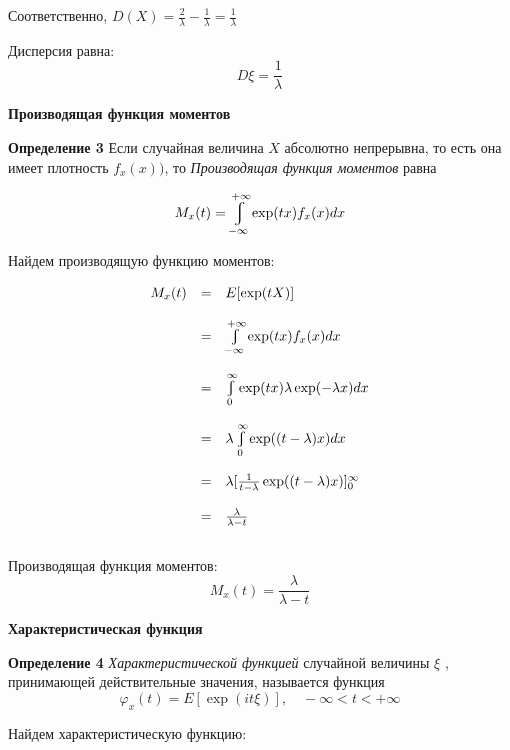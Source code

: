 \documentclass[a4paper,12pt, oneside]{book}
\let\int\varint
\begin{document}
	
	Соответственно, $D(X) = \frac{2}{\lambda} - \frac{1}{\lambda} = \frac{1}{\lambda}$ 
	\vspace{\baselineskip}
	
	Дисперсия равна:
	$$
	D\xi =  \frac{1}{\lambda}
	$$
	
	
	\vspace{5mm}
	\large{\textbf{Производящая функция моментов}}
	\vspace{5mm}
	
	\normalsize{\textbf{Определение 3}} Если случайная величина $X$ абсолютно непрерывна, то есть она имеет плотность $f_x(x))$, то \textit{ Производящая функция моментов } равна
		
	$$
	M_x(t) =  \int_{-\infty}^{+\infty} \exp(tx) f_x(x)dx
	$$
	
	\vspace{\baselineskip}
	Найдем производящую функцию моментов:
	
	$$
	\begin{array}{rcl}
	M_x(t) &=& E[\exp(tX)] \\
	\\
	&=& \int\limits_{-\infty}^{+\infty} \exp(tx) f_x(x)dx \\
	\\
	&=& \int\limits_0^\infty \exp(tx) \lambda \exp(-\lambda x)dx\\
	\\
	&=& \lambda \int\limits_0^\infty \exp((t-\lambda) x)dx\\
	\\
	&=&\lambda[\frac{1}{t-\lambda} \exp((t-\lambda) x)]_0^\infty\\
	\\
	&=&\frac{\lambda}{\lambda-t}
	\end{array}
	$$
	\\
	Производящая функция моментов:
	$$
	M_x(t) = \frac{\lambda}{\lambda-t}
	$$
	 
	 
	\newpage
	\large{\textbf{{Характеристическая функция}}}
	\vspace{5mm}
	
	\normalsize{\textbf{Определение 4}}\textit{ Характеристической функцией } случайной величины $\xi$ , принимающей действительные значения, называется функция 
	$$
	\varphi_x(t) = E[\exp(it\xi)],   \quad    -\infty <t < +\infty
	$$
	 
	\vspace{\baselineskip}
	Найдем характеристическую функцию:
	
\end{document}
